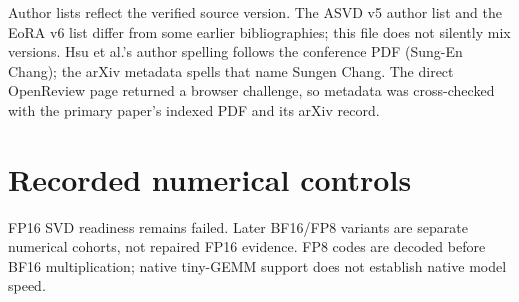 \documentclass[10pt]{article}
\begin{document}
Author lists reflect the verified source version. The ASVD v5 author list and
the EoRA v6 list differ from some earlier bibliographies; this file does not
silently mix versions. Hsu et al.'s author spelling follows the conference PDF
(Sung-En Chang); the arXiv metadata spells that name Sungen Chang. The direct
OpenReview page returned a browser challenge, so metadata was cross-checked
with the primary paper's indexed PDF and its arXiv record.

\section{Recorded numerical controls}

FP16 SVD readiness remains failed. Later BF16/FP8 variants are separate numerical cohorts, not repaired FP16 evidence. FP8 codes are decoded before BF16 multiplication; native tiny-GEMM support does not establish native model speed.
\end{document}
